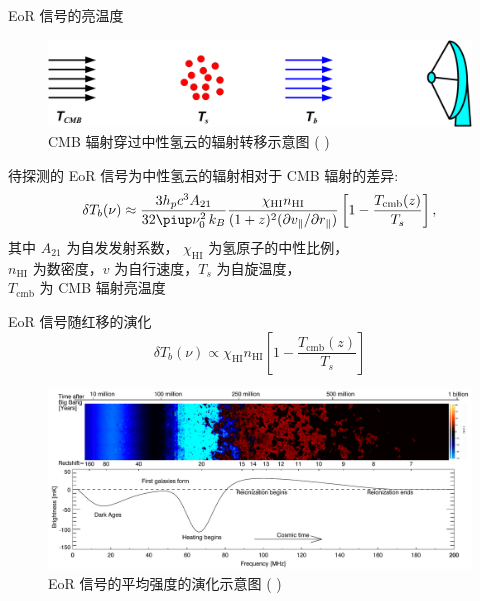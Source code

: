 \documentclass{beamer}
\newcommand{\R}[1]{\text{#1}}  %
\newcommand{\Cpi}{\piup}  %
\newcommand{\citeay}[1]{\citeauthor{#1} \citeyear{#1} \parencite{#1}}
\begin{document}
\begin{frame}{EoR 信号的亮温度}
  \begin{figure}
    \centering
    \includegraphics[width=\textwidth]{21cm-radiative-transfer}
    \caption{CMB 辐射穿过中性氢云的辐射转移示意图 (\citeay{zaroubi2013})}
  \end{figure}

  待探测的 \alert{EoR 信号}为中性氢云的辐射相对于 CMB 辐射的\alert{差异}:
  \begin{equation}
    \delta T_b(\nu) \approx
      \frac{3 h_p c^3 A_{21}}{32\Cpi \nu_0^2 \,k_B}
      \frac{\chi_{\R{HI}} n_{\R{HI}}}{
        (1+z)^2 (\partial v_{\parallel} / \partial r_{\parallel})}
      \left[ 1 - \frac{T_{\R{cmb}}(z)}{T_s} \right] ,
  \end{equation}
  其中 $A_{21}$ 为自发发射系数，
  $\chi_{\R{HI}}$ 为氢原子的中性比例， \\
  $n_{\R{HI}}$ 为数密度，$v$ 为自行速度，$T_s$ 为自旋温度，\\
  $T_{\R{cmb}}$ 为 CMB 辐射亮温度
\end{frame}

\begin{frame}{EoR 信号随红移的演化}
  \begin{equation}
    \delta T_b(\nu) \propto
      \chi_{\R{HI}} n_{\R{HI}}
      \left[ 1 - \frac{T_{\R{cmb}}(z)}{T_s} \right]
  \end{equation}
  \begin{figure}
    \centering
    \includegraphics[width=\textwidth]{eor-signal-evolution}
    \caption{EoR 信号的平均强度的演化示意图 (\citeay{pritchard2012})}
  \end{figure}
\end{frame}
\end{document}
